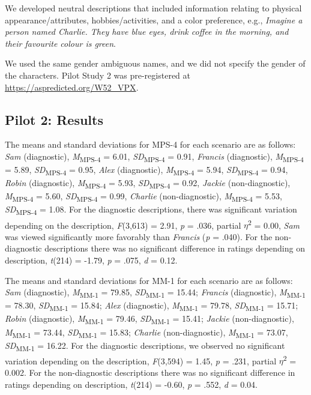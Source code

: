 \documentclass[
  english,
  man,floatsintext]{apa7}
\begin{document}
We developed neutral descriptions that included information relating to physical appearance/attributes, hobbies/activities, and a color preference, e.g., \emph{Imagine a person named Charlie. They have blue eyes, drink coffee in the morning, and their favourite colour is green}.

We used the same gender ambiguous names, and we did not specify the gender of the characters. Pilot Study 2 was pre-registered at \color{blue}\url{https://aspredicted.org/W52_VPX}\color{black}.

\hypertarget{pilot-2-results}{%
\subsection{Pilot 2: Results}\label{pilot-2-results}}

The means and standard deviations for MPS-4 for each scenario are as follows:
\emph{Sam} (diagnostic),
\emph{M}\textsubscript{MPS-4} = 6.01, \emph{SD}\textsubscript{MPS-4} = 0.91,
\emph{Francis} (diagnostic),
\emph{M}\textsubscript{MPS-4} = 5.89, \emph{SD}\textsubscript{MPS-4} = 0.95,
\emph{Alex} (diagnostic),
\emph{M}\textsubscript{MPS-4} = 5.94, \emph{SD}\textsubscript{MPS-4} = 0.94,
\emph{Robin} (diagnostic),
\emph{M}\textsubscript{MPS-4} = 5.93, \emph{SD}\textsubscript{MPS-4} = 0.92,
\emph{Jackie} (non-diagnostic),
\emph{M}\textsubscript{MPS-4} = 5.60, \emph{SD}\textsubscript{MPS-4} = 0.99,
\emph{Charlie} (non-diagnostic),
\emph{M}\textsubscript{MPS-4} = 5.53, \emph{SD}\textsubscript{MPS-4} = 1.08. For the diagnostic descriptions, there was significant variation depending on the description, \emph{F}(3,613) = 2.91, \emph{p} = .036, partial \(\eta\)\textsuperscript{2} = 0.00, \emph{Sam} was viewed significantly more favorably than \emph{Francis} (\emph{p} = .040). For the non-diagnostic descriptions there was no significant difference in ratings depending on description, \emph{t}(214) = -1.79, \emph{p} = .075, \emph{d} = 0.12.

The means and standard deviations for MM-1 for each scenario are as follows:
\emph{Sam} (diagnostic),
\emph{M}\textsubscript{MM-1} = 79.85, \emph{SD}\textsubscript{MM-1} = 15.44;
\emph{Francis} (diagnostic),
\emph{M}\textsubscript{MM-1} = 78.30, \emph{SD}\textsubscript{MM-1} = 15.84;
\emph{Alex} (diagnostic),
\emph{M}\textsubscript{MM-1} = 79.78, \emph{SD}\textsubscript{MM-1} = 15.71;
\emph{Robin} (diagnostic),
\emph{M}\textsubscript{MM-1} = 79.46, \emph{SD}\textsubscript{MM-1} = 15.41;
\emph{Jackie} (non-diagnostic),
\emph{M}\textsubscript{MM-1} = 73.44, \emph{SD}\textsubscript{MM-1} = 15.83;
\emph{Charlie} (non-diagnostic),
\emph{M}\textsubscript{MM-1} = 73.07, \emph{SD}\textsubscript{MM-1} = 16.22. For the diagnostic descriptions, we observed no significant variation depending on the description, \emph{F}(3,594) = 1.45, \emph{p} = .231, partial \(\eta\)\textsuperscript{2} = 0.002. For the non-diagnostic descriptions there was no significant difference in ratings depending on description, \emph{t}(214) = -0.60, \emph{p} = .552, \emph{d} = 0.04.
\end{document}

